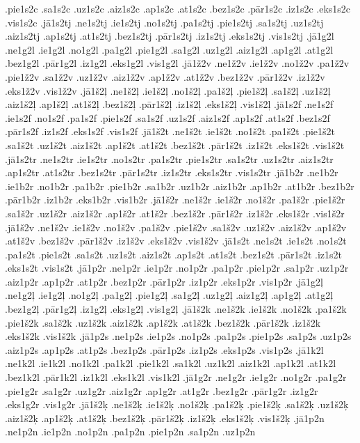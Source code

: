 {.pie1s2c
.sa1s2c
.uz1s2c
.aiz1s2c
.ap1s2c
.at1s2c
.bez1s2c
.pār1s2c
.iz1s2c
.eks1s2c
.vis1s2c
.jā1s2tj
.ne1s2tj
.ie1s2tj
.no1s2tj
.pa1s2tj
.pie1s2tj
.sa1s2tj
.uz1s2tj
.aiz1s2tj
.ap1s2tj
.at1s2tj
.bez1s2tj
.pār1s2tj
.iz1s2tj
.eks1s2tj
.vis1s2tj
.jā1g2l
.ne1g2l
.ie1g2l
.no1g2l
.pa1g2l
.pie1g2l
.sa1g2l
.uz1g2l
.aiz1g2l
.ap1g2l
.at1g2l
.bez1g2l
.pār1g2l
.iz1g2l
.eks1g2l
.vis1g2l
.jā1ž2v
.ne1ž2v
.ie1ž2v
.no1ž2v
.pa1ž2v
.pie1ž2v
.sa1ž2v
.uz1ž2v
.aiz1ž2v
.ap1ž2v
.at1ž2v
.bez1ž2v
.pār1ž2v
.iz1ž2v
.eks1ž2v
.vis1ž2v
.jā1š2ļ
.ne1š2ļ
.ie1š2ļ
.no1š2ļ
.pa1š2ļ
.pie1š2ļ
.sa1š2ļ
.uz1š2ļ
.aiz1š2ļ
.ap1š2ļ
.at1š2ļ
.bez1š2ļ
.pār1š2ļ
.iz1š2ļ
.eks1š2ļ
.vis1š2ļ
.jā1s2f
.ne1s2f
.ie1s2f
.no1s2f
.pa1s2f
.pie1s2f
.sa1s2f
.uz1s2f
.aiz1s2f
.ap1s2f
.at1s2f
.bez1s2f
.pār1s2f
.iz1s2f
.eks1s2f
.vis1s2f
.jā1š2t
.ne1š2t
.ie1š2t
.no1š2t
.pa1š2t
.pie1š2t
.sa1š2t
.uz1š2t
.aiz1š2t
.ap1š2t
.at1š2t
.bez1š2t
.pār1š2t
.iz1š2t
.eks1š2t
.vis1š2t
.jā1s2tr
.ne1s2tr
.ie1s2tr
.no1s2tr
.pa1s2tr
.pie1s2tr
.sa1s2tr
.uz1s2tr
.aiz1s2tr
.ap1s2tr
.at1s2tr
.bez1s2tr
.pār1s2tr
.iz1s2tr
.eks1s2tr
.vis1s2tr
.jā1b2r
.ne1b2r
.ie1b2r
.no1b2r
.pa1b2r
.pie1b2r
.sa1b2r
.uz1b2r
.aiz1b2r
.ap1b2r
.at1b2r
.bez1b2r
.pār1b2r
.iz1b2r
.eks1b2r
.vis1b2r
.jā1š2r
.ne1š2r
.ie1š2r
.no1š2r
.pa1š2r
.pie1š2r
.sa1š2r
.uz1š2r
.aiz1š2r
.ap1š2r
.at1š2r
.bez1š2r
.pār1š2r
.iz1š2r
.eks1š2r
.vis1š2r
.jā1š2v
.ne1š2v
.ie1š2v
.no1š2v
.pa1š2v
.pie1š2v
.sa1š2v
.uz1š2v
.aiz1š2v
.ap1š2v
.at1š2v
.bez1š2v
.pār1š2v
.iz1š2v
.eks1š2v
.vis1š2v
.jā1s2t
.ne1s2t
.ie1s2t
.no1s2t
.pa1s2t
.pie1s2t
.sa1s2t
.uz1s2t
.aiz1s2t
.ap1s2t
.at1s2t
.bez1s2t
.pār1s2t
.iz1s2t
.eks1s2t
.vis1s2t
.jā1p2r
.ne1p2r
.ie1p2r
.no1p2r
.pa1p2r
.pie1p2r
.sa1p2r
.uz1p2r
.aiz1p2r
.ap1p2r
.at1p2r
.bez1p2r
.pār1p2r
.iz1p2r
.eks1p2r
.vis1p2r
.jā1g2ļ
.ne1g2ļ
.ie1g2ļ
.no1g2ļ
.pa1g2ļ
.pie1g2ļ
.sa1g2ļ
.uz1g2ļ
.aiz1g2ļ
.ap1g2ļ
.at1g2ļ
.bez1g2ļ
.pār1g2ļ
.iz1g2ļ
.eks1g2ļ
.vis1g2ļ
.jā1š2k
.ne1š2k
.ie1š2k
.no1š2k
.pa1š2k
.pie1š2k
.sa1š2k
.uz1š2k
.aiz1š2k
.ap1š2k
.at1š2k
.bez1š2k
.pār1š2k
.iz1š2k
.eks1š2k
.vis1š2k
.jā1p2s
.ne1p2s
.ie1p2s
.no1p2s
.pa1p2s
.pie1p2s
.sa1p2s
.uz1p2s
.aiz1p2s
.ap1p2s
.at1p2s
.bez1p2s
.pār1p2s
.iz1p2s
.eks1p2s
.vis1p2s
.jā1k2l
.ne1k2l
.ie1k2l
.no1k2l
.pa1k2l
.pie1k2l
.sa1k2l
.uz1k2l
.aiz1k2l
.ap1k2l
.at1k2l
.bez1k2l
.pār1k2l
.iz1k2l
.eks1k2l
.vis1k2l
.jā1g2r
.ne1g2r
.ie1g2r
.no1g2r
.pa1g2r
.pie1g2r
.sa1g2r
.uz1g2r
.aiz1g2r
.ap1g2r
.at1g2r
.bez1g2r
.pār1g2r
.iz1g2r
.eks1g2r
.vis1g2r
.jā1š2ķ
.ne1š2ķ
.ie1š2ķ
.no1š2ķ
.pa1š2ķ
.pie1š2ķ
.sa1š2ķ
.uz1š2ķ
.aiz1š2ķ
.ap1š2ķ
.at1š2ķ
.bez1š2ķ
.pār1š2ķ
.iz1š2ķ
.eks1š2ķ
.vis1š2ķ
.jā1p2n
.ne1p2n
.ie1p2n
.no1p2n
.pa1p2n
.pie1p2n
.sa1p2n
.uz1p2n
}
